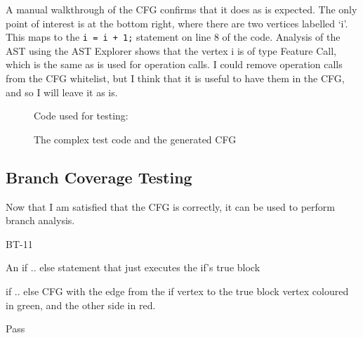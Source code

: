 A manual walkthrough of the CFG confirms that it does as is expected. The only point of interest is at the bottom right, where there are two vertices labelled `i'. This maps to the \verb|i = i + 1;| statement on line 8 of the code. Analysis of the AST using the AST Explorer shows that the vertex i is of type Feature Call, which is the same as is used for operation calls. I could remove operation calls from the CFG whitelist, but I think that it is useful to have them in the CFG, and so I will leave it as is.

\begin{figure}
\begin{minipage}{.6\textwidth}
\centering
\end{minipage}
\begin{minipage}{.39\textwidth}
  \centering
  Code used for testing:
  
\end{minipage}
\caption{The complex test code and the generated CFG}
\label{fig:testComplex}
\end{figure}


\subsection{Branch Coverage Testing}

Now that I am satisfied that the CFG is correctly, it can be used to perform branch analysis.

\begin{minipage}{0.6\textwidth}
\begin{description}[style=sameline,leftmargin=3.5cm,nolistsep]
\item[\hspace*{0.3cm}Label] BT-11
\item[\hspace*{0.3cm}Description] An if .. else statement that just executes the if's true block
\item[\hspace*{0.3cm}Expected Output] if .. else CFG with the edge from the if vertex to the true block vertex coloured in green, and the other side in red.
\item[\hspace*{0.3cm}Result] Pass
\end{description}
\end{minipage}
\begin{minipage}{0.39\textwidth}
\centering
{}
\end{minipage}

